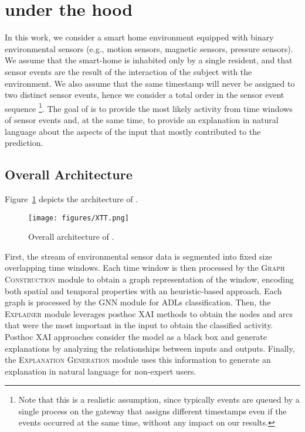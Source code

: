 \section{\acronym{} under the hood}

In this work, we consider a smart home environment equipped with binary environmental sensors (e.g., motion sensors, magnetic sensors, pressure sensors). We assume that the smart-home is inhabited only by a single resident, and that sensor events are the result of the interaction of the subject with the environment. We also assume that the same timestamp will never be assigned to two distinct sensor events, hence we consider a total order in the sensor event sequence \footnote{Note that this is a realistic assumption, since typically events are queued by a single process on the gateway that assigns different timestamps even if the events occurred at the same time, without any impact on our results.}. The goal of \acronym{} is to provide the most likely activity from time windows of sensor events and, at the same time, to provide an explanation in natural language about the aspects of the input that mostly contributed to the prediction.


\subsection{Overall Architecture}
Figure~\ref{fig:architecture} depicts the architecture of \acronym{}.

   \begin{figure}[h!]
        \centering
        \texttt{[image: figures/XTT.png]}
        \caption{Overall architecture of \acronym{}.}
        \label{fig:architecture}
    \end{figure}


First, the stream of environmental sensor data is segmented into fixed size overlapping time windows. Each time window is then processed by the \textsc{Graph Construction} module to obtain a graph representation of the window, encoding both spatial and temporal properties with an heuristic-based approach. Each graph is processed by the \textsc{GNN} module for ADLs classification. Then, the \textsc{Explainer} module leverages posthoc XAI methods to obtain the nodes and arcs that were the most important in the input to obtain the classified activity. Posthoc XAI approaches consider the model as a black box and generate explanations by analyzing the relationships between inputs and outputs. Finally, the \textsc{Explanation Generation} module uses this information to generate an explanation in natural language for non-expert users. 



